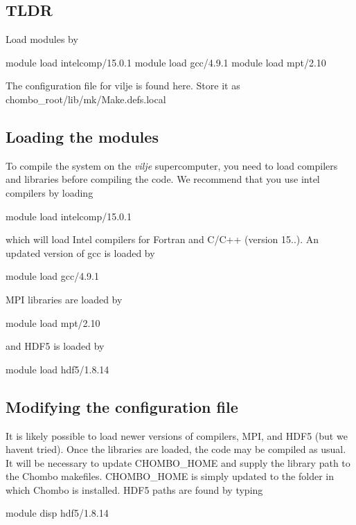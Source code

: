 \subsection*{T\+L\+DR }

Load modules by \begin{DoxyVerb}module load intelcomp/15.0.1
module load gcc/4.9.1
module load mpt/2.10
\end{DoxyVerb}


The configuration file for vilje is found here. Store it as chombo\+\_\+root/lib/mk/\+Make.\+defs.\+local

\subsection*{Loading the modules }

To compile the system on the {\itshape vilje} supercomputer, you need to load compilers and libraries before compiling the code. We recommend that you use intel compilers by loading \begin{DoxyVerb}module load intelcomp/15.0.1
\end{DoxyVerb}


which will load Intel compilers for Fortran and C/\+C++ (version 15..). An updated version of gcc is loaded by \begin{DoxyVerb}module load gcc/4.9.1
\end{DoxyVerb}


M\+PI libraries are loaded by \begin{DoxyVerb}module load mpt/2.10
\end{DoxyVerb}


and H\+D\+F5 is loaded by \begin{DoxyVerb}module load hdf5/1.8.14
\end{DoxyVerb}


\subsection*{Modifying the configuration file }

It is likely possible to load newer versions of compilers, M\+PI, and H\+D\+F5 (but we haven\textquotesingle{}t tried). Once the libraries are loaded, the code may be compiled as usual. It will be necessary to update C\+H\+O\+M\+B\+O\+\_\+\+H\+O\+ME and supply the library path to the Chombo makefiles. C\+H\+O\+M\+B\+O\+\_\+\+H\+O\+ME is simply updated to the folder in which Chombo is installed. H\+D\+F5 paths are found by typing \begin{DoxyVerb}module disp hdf5/1.8.14
\end{DoxyVerb}



